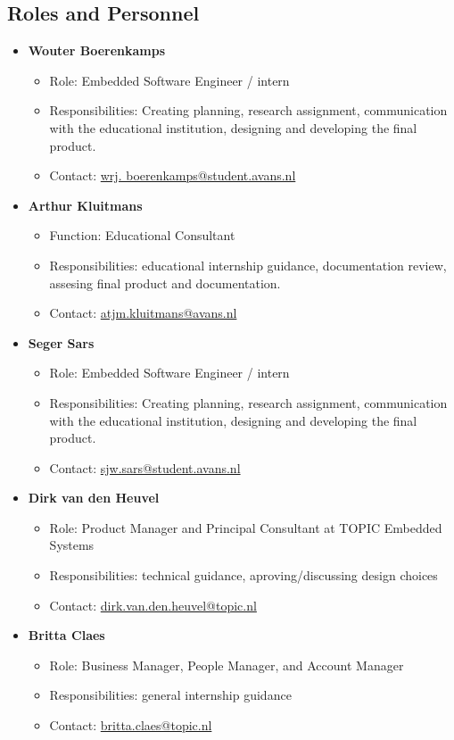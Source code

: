 \documentclass{article}
\begin{document}
\subsection{Roles and Personnel}
\begin{itemize} 
    \item \textbf{Wouter Boerenkamps} 
\begin{itemize} 
    \item Role: Embedded Software Engineer / intern
    \item Responsibilities: Creating planning, research assignment,
    communication with the educational institution, designing and developing the
    final product. 
    \item Contact: \href{mailto:wrj.boerenkamps@student.avans.nl}{wrj.
boerenkamps@student.avans.nl} 
\end{itemize}

\item \textbf{Arthur Kluitmans}
\begin{itemize} 
    \item Function: Educational Consultant
    \item Responsibilities: educational internship guidance, documentation review, assesing final product and documentation.
    \item Contact: \href{mailto:atjm.kluitmans@avans.nl}{atjm.kluitmans@avans.nl}
\end{itemize}

\item \textbf{Seger Sars}  
\begin{itemize} 
    \item Role: Embedded Software Engineer / intern
    \item Responsibilities: Creating planning, research assignment, communication with the
    educational institution, designing and developing the final product. 
    \item Contact: \href{mailto:sjw.sars@student.avans.nl}{sjw.sars@student.avans.nl}
\end{itemize}

\item \textbf{Dirk van den Heuvel} 
\begin{itemize} 
    \item Role: Product Manager and Principal Consultant at TOPIC Embedded
    Systems
    \item Responsibilities: technical guidance, aproving/discussing design choices
    \item Contact: \href{mailto:dirk.van.
den.heuvel@topic.nl}{dirk.van.den.heuvel@topic.nl} 
\end{itemize}

    \item \textbf{Britta Claes} 
\begin{itemize} 
    \item Role: Business Manager, People Manager, and Account Manager
    \item Responsibilities: general internship guidance
    \item Contact: \href{mailto:britta.claes@topic.
    nl}{britta.claes@topic.nl} 
\end{itemize} 
\end{itemize}
\end{document}
